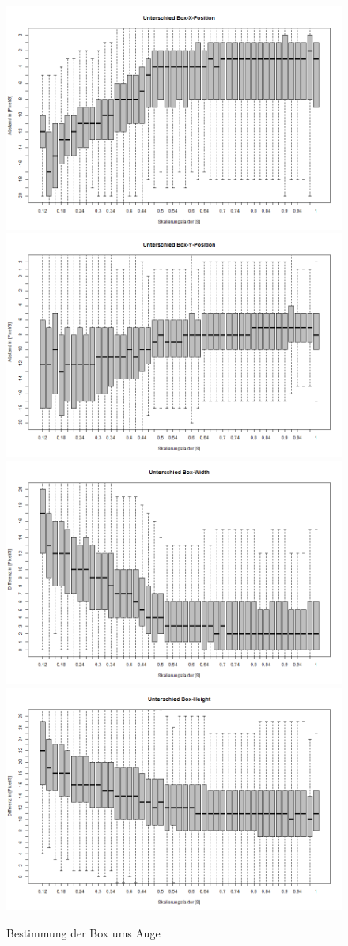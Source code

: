 \begin{figure}
	\centering
	\includegraphics[width=0.245\linewidth]{Eye_Img_Box/Openface_BoxX}
	\includegraphics[width=0.245\linewidth]{Eye_Img_Box/Openface_BoxY}
	\includegraphics[width=0.245\linewidth]{Eye_Img_Box/Openface_BoxW}
	\includegraphics[width=0.245\linewidth]{Eye_Img_Box/Openface_BoxH}
	\caption{Bestimmung der Box ums Auge}
	\label{OpenFace_Eye_Box}
\end{figure}


